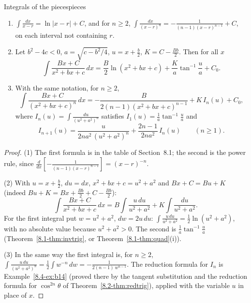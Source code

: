 \documentclass[11pt]{article}
\begin{document}
\begin{thm}{Integrals of the pieces}{pieces}
\begin{enumerate}[label=(\arabic*)]
  \item $\displaystyle\int\frac{dx}{x-r}=\ln\lvert x-r\rvert+C$, and for $n\ge2$, $\displaystyle\int\frac{dx}{(x-r)^n}=-\frac1{(n-1)(x-r)^{n-1}}+C$, on each interval not containing $r$.
  \item Let $b^2-4c<0$, $a=\sqrt{c-b^2/4}$, $u=x+\frac b2$, $K=C-\frac{Bb}2$. Then for all $x$
  \[\int\frac{Bx+C}{x^2+bx+c}\,dx=\frac B2\ln\left(x^2+bx+c\right)+\frac Ka\tan^{-1}\frac ua+C_0 .\]
  \item With the same notation, for $n\ge2$,
  \[\int\frac{Bx+C}{(x^2+bx+c)^n}\,dx=-\frac{B}{2(n-1)\left(x^2+bx+c\right)^{n-1}}+K\,I_n(u)+C_0,\]
  where $I_n(u)=\displaystyle\int\frac{du}{(u^2+a^2)^n}$ satisfies $I_1(u)=\frac1a\tan^{-1}\frac ua$ and
  \[I_{n+1}(u)=\frac{u}{2na^2\,(u^2+a^2)^n}+\frac{2n-1}{2na^2}\,I_n(u)\qquad(n\ge1).\]
\end{enumerate}
\end{thm}
\begin{proof}
(1) The first formula is in the table of Section~8.1; the second is the power rule, since $\frac d{dx}\left[-\frac1{(n-1)(x-r)^{n-1}}\right]=(x-r)^{-n}$.

(2) With $u=x+\frac b2$, $du=dx$, $x^2+bx+c=u^2+a^2$ and $Bx+C=Bu+K$ (indeed $Bu+K=Bx+\frac{Bb}2+C-\frac{Bb}2$):
\[\int\frac{Bx+C}{x^2+bx+c}\,dx=B\int\frac{u\,du}{u^2+a^2}+K\int\frac{du}{u^2+a^2}.\]
For the first integral put $w=u^2+a^2$, $dw=2u\,du$: $\int\frac{u\,du}{u^2+a^2}=\frac12\ln(u^2+a^2)$, with no absolute value because $u^2+a^2>0$. The second is $\frac1a\tan^{-1}\frac ua$ (Theorem~\ref{8.1-thm:invtrig}, or Theorem~\ref{8.1-thm:quad}(i)).

(3) In the same way the first integral is, for $n\ge2$, $\int\frac{u\,du}{(u^2+a^2)^n}=\frac12\int w^{-n}\,dw=-\frac{1}{2(n-1)\,w^{n-1}}$. The reduction formula for $I_n$ is Example~\ref{8.4-ex:b14} (proved there by the tangent substitution and the reduction formula for $\cos^{2n}\theta$ of Theorem~\ref{8.2-thm:redtrig}), applied with the variable $u$ in place of $x$.
\end{proof}
\end{document}
